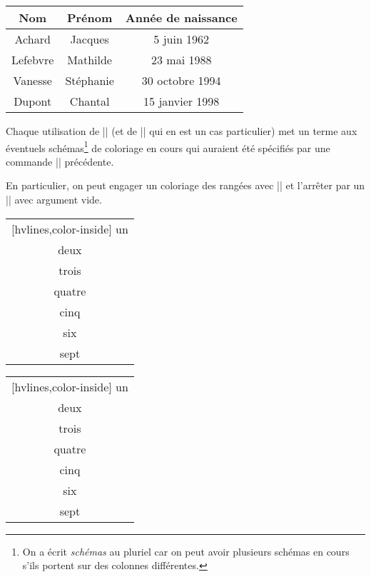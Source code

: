 \documentclass[dvipsnames]{article}%
\begin{document}
\begin{center}
\NewDocumentCommand { \Blue } { } {}
\begin{NiceTabular}{>{\Blue}c>{\Blue}cc}
\toprule
{}
Nom & Prénom & Année de naissance \\
\midrule
Achard & Jacques & 5 juin 1962 \\
Lefebvre & Mathilde & 23 mai 1988 \\
Vanesse & Stéphanie & 30 octobre 1994 \\
Dupont & Chantal & 15 janvier 1998 \\
\bottomrule
\end{NiceTabular}
\end{center}

\bigskip
Chaque utilisation de |\rowlistcolors| (et de |\rowcolors| qui en est un cas
particulier) met un terme aux éventuels schémas\footnote{On a écrit
  \emph{schémas} au pluriel car on peut avoir plusieurs schémas en cours s'ils
  portent sur des colonnes différentes.} de coloriage en cours qui auraient été
spécifiés par une commande |\rowlistcolors| précédente.

En particulier, on peut engager un coloriage des rangées avec
|| et l'arrêter par un |\rowlistcolors{}| avec argument vide.

\bigskip
\begin{Code}[width=10cm]
\begin{NiceTabular}{c}[hvlines,color-inside]
un \\
deux \\
\emph{}
trois \\
quatre \\
cinq \\
\emph{\rowlistcolors{}}
six \\
sept \\
\end{NiceTabular}
\end{Code}
\begin{NiceTabular}{c}[hvlines,color-inside]
un \\
deux \\
trois \\
quatre \\
cinq \\
\rowlistcolors{}
six \\
sept \\
\end{NiceTabular}
\end{document}
